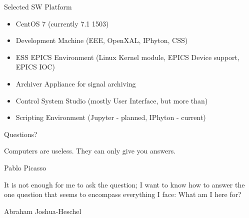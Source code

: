 \documentclass[
  9pt
  , table
  , ignorenonframetext
]{beamer}
\begin{document}
\begin{frame}{Selected SW Platform}
  \begin{itemize}
  \item CentOS 7 (currently 7.1 1503)
  \item Development Machine (EEE, OpenXAL, IPhyton, CSS)
  \item ESS EPICS Environment (Linux Kernel module, EPICS Device support, EPICS IOC)
  \item Archiver Appliance for signal archiving 
  \item Control System Studio (mostly User Interface, but more than)
  \item Scripting Environment (Jupyter - planned, IPhyton - current)
  \end{itemize}

\end{frame}


\begin{frame}{Questions?}

   Computers are useless. They can only give you answers.
   \begin{flushright}
     Pablo Picasso 
   \end{flushright}
   
   It is not enough for me to ask the question; I want to know how to answer the one question that seems to encompass everything I face: What am I here for?
   \begin{flushright}
    Abraham Joshua-Heschel
   \end{flushright}

   
\end{frame}



\end{document}
